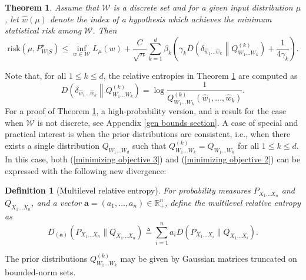 \documentclass{article}
\newtheorem{definition}{Definition}
\newtheorem{theorem}{Theorem}
\newcommand{\risk}[0]{\mathrm{risk}}
\newcommand{\W}[0]{\mathcal{W}}
\begin{document}
 \begin{theorem}\label{CMI excess risk} Assume that $\W$ is a discrete set and for a given input distribution $\mu$, let $\widehat{w}(\mu)$ denote the index of a hypothesis which achieves the minimum statistical risk among $\W$. Then
	\begin{equation}
		\risk\left(\mu, P_{W|S}^{\star}\right)\leq \inf_{w\in\W}L_{\mu}(w)+\frac{C}{\sqrt{n}}\sum_{k=1}^d \beta_k\left(\gamma_k D\left(\delta_{\widehat{w}_1 \dots \widehat{w}_k}\middle\|Q^{(k)}_{W_1\dots W_k}\right)+\frac{1}{4\gamma_k}\right). \label{minimizing objective 2}
\end{equation} 
\end{theorem}
Note that, for all $1\leq k\leq d$, the relative entropies in Theorem \ref{CMI excess risk} are computed as
\begin{equation}
    D\left(\delta_{\widehat{w}_1 \dots \widehat{w}_k}\middle\|Q^{(k)}_{W_1\dots W_k}\right)=\log \frac{1}{Q^{(k)}_{W_1\dots W_k}(\widehat{w}_1, \dots ,\widehat{w}_k)}. \nonumber
\end{equation}
For a proof of Theorem \ref{CMI excess risk}, a high-probability version, and a result for the case when $\W$ is not discrete, see Appendix \ref{gen bounds section}. A case of special and practical interest is when the prior distributions are consistent, i.e., when there exists a single distribution $Q_{W_1\dots W_d}$ such that $Q^{(k)}_{W_1\dots W_k}=Q_{W_1\dots W_k}$ for all $1\leq k\leq d$. In this case, both (\ref{minimizing objective 3}) and (\ref{minimizing objective 2}) can be expressed with the following new divergence: 
\begin{definition}[Multilevel relative entropy]\label{multilevel relative entropy definition} For probability measures $P_{X_1\dots X_n}$ and $Q_{X_1\dots X_n}$, and a vector $\mathbf{a}=(a_1,\dots, a_n)\in \mathbb{R}_+^{n}$, define the \emph{multilevel relative entropy} as
\begin{equation}
	D_{(\mathbf{a})}\left(P_{X_1\dots X_n}\|Q_{X_1\dots X_n}\right)\triangleq\sum_{i=1}^n a_iD\left(P_{X_1\dots X_i}\|Q_{X_1\dots X_i}\right).
\end{equation} 
\end{definition}
The prior distributions $Q^{(k)}_{W_1\dots W_k}$ may be given by Gaussian matrices truncated on  bounded-norm sets. 
\end{document}
